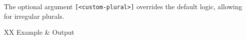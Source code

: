 \begin{macrolist}
{					The optional argument \verb|[<custom-plural>]| overrides the default logic, allowing for irregular plurals.


					\begin{RpgTable}{XX}
						Example & Output \\
					\end{RpgTable}
				}

			
		\end{macrolist}

